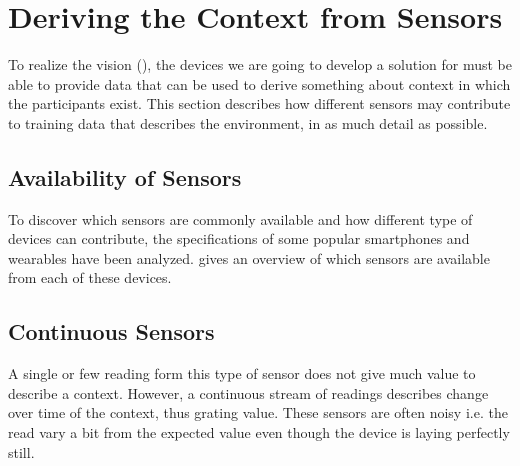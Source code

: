 
\section{Deriving the Context from Sensors}
\label{sec:deriving_the_context_from_sensors}

To realize the vision (), the devices we are going to develop a solution for must be able to provide data that can be used to derive something about context in which the participants exist. This section describes how different sensors may contribute to training data that describes the environment, in as much detail as possible. 

\subsection{Availability of Sensors}
To discover which sensors are commonly available and how different type of devices can contribute, the specifications of some popular smartphones and wearables have been analyzed.  gives an overview of which sensors are available from each of these devices. 



\subsection{Continuous Sensors}
A single or few reading form this type of sensor does not give much value to describe a context. However, a continuous stream of readings describes change over time of the context, thus grating value. These sensors are often noisy i.e. the read vary a bit from the expected value even though the device is laying perfectly still.

